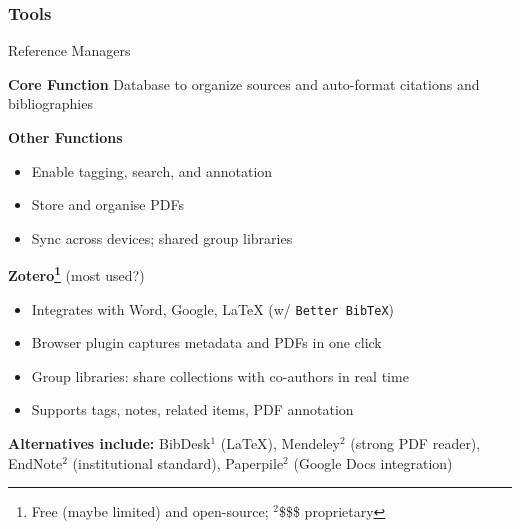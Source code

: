 \documentclass{beamer}
\begin{document}
\subsubsection{Tools}
\begin{frame}{Reference Managers}

  \footnotesize

  \begin{block}{\textbf{Core Function}}
    Database to organize sources and auto-format citations and bibliographies
  \end{block}
  \textbf{Other Functions}
  \begin{itemize}\scriptsize
    \item Enable tagging, search, and annotation
    \item Store and organise PDFs
    \item Sync across devices; shared group libraries
  \end{itemize}

  \medskip
  \textbf{Zotero\footnote{{\tiny Free (maybe limited) and open-source; $\phantom{}^2$\$\$\$ proprietary}}} (most used?)
  \begin{itemize}
     \item Integrates with Word, Google, \LaTeX{}
      (w/ \texttt{Better BibTeX})
    \item Browser plugin captures
      metadata and PDFs in one click
    \item Group libraries: share collections with
      co-authors in real time
    \item Supports tags, notes, related items, PDF annotation
  \end{itemize}

  \medskip
  \scriptsize
  \textbf{Alternatives include:} 
  BibDesk$\phantom{}^1$ (\LaTeX), 
  Mendeley$\phantom{}^2$ (strong PDF reader),
  EndNote$\phantom{}^2$ (institutional standard), 
  Paperpile$\phantom{}^2$ (Google Docs integration)

\end{frame}


\end{document}
